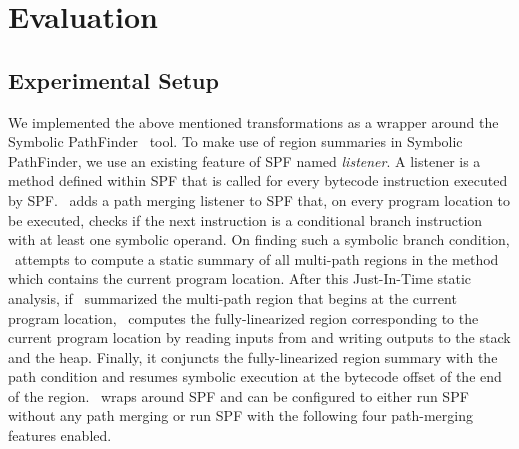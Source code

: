 \section{Evaluation}
\label{sec:results}
\subsection{Experimental Setup}
%
We implemented the above mentioned transformations as a wrapper around the Symbolic PathFinder~\cite{spf} tool.
%
To make use of region summaries in Symbolic PathFinder, we use an existing feature of SPF named \textit{listener}.
%
A listener is a method defined within SPF that is called for every bytecode instruction executed by SPF.
%
\tool\ adds a path merging listener to SPF that, on every program location to be executed, checks if the next
instruction is a conditional branch instruction with at least one symbolic operand.
%
On finding such a symbolic branch condition, \tool\ attempts to compute a static summary of all multi-path
regions in the method which contains the current program location.
%
After this Just-In-Time static analysis, if \tool\ summarized the multi-path region that begins at the current program
location, \tool\ computes the fully-linearized region corresponding to the current program location by reading inputs from
and writing outputs to the stack and the heap.
%
Finally, it conjuncts the fully-linearized region summary with the path condition and resumes symbolic execution at the
bytecode offset of the end of the region.
%
\tool\ wraps around SPF and can be configured to either run SPF without any path merging or run SPF with the
following four path-merging features enabled.

